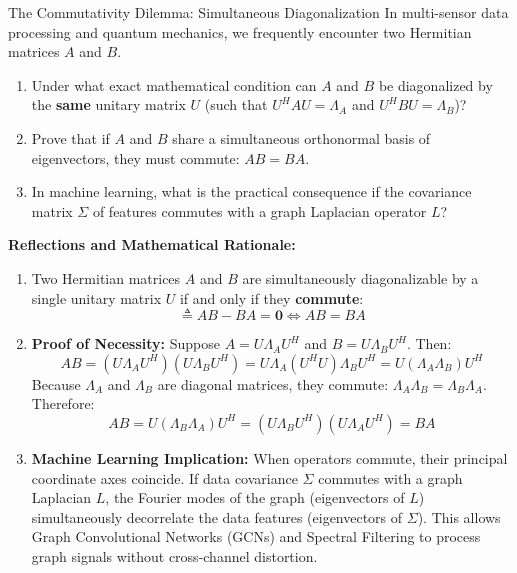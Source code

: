 \begin{ponderbox}{The Commutativity Dilemma: Simultaneous Diagonalization}
In multi-sensor data processing and quantum mechanics, we frequently encounter two Hermitian matrices $A$ and $B$.
\begin{enumerate}
    \item Under what exact mathematical condition can $A$ and $B$ be diagonalized by the \textbf{same} unitary matrix $U$ (such that $U^H A U = \Lambda_A$ and $U^H B U = \Lambda_B$)?
    \item Prove that if $A$ and $B$ share a simultaneous orthonormal basis of eigenvectors, they must commute: $AB = BA$.
    \item In machine learning, what is the practical consequence if the covariance matrix $\Sigma$ of features commutes with a graph Laplacian operator $L$?
\end{enumerate}
\tcblower
\textbf{Reflections and Mathematical Rationale:}
\begin{enumerate}
    \item Two Hermitian matrices $A$ and $B$ are simultaneously diagonalizable by a single unitary matrix $U$ if and only if they \textbf{commute}:
    \begin{equation*}
    [A, B] \triangleq AB - BA = \mathbf{0} \iff AB = BA
    \end{equation*}
    \item \textbf{Proof of Necessity:} Suppose $A = U \Lambda_A U^H$ and $B = U \Lambda_B U^H$. Then:
    \begin{equation*}
    AB = (U \Lambda_A U^H)(U \Lambda_B U^H) = U \Lambda_A (U^H U) \Lambda_B U^H = U (\Lambda_A \Lambda_B) U^H
    \end{equation*}
    Because $\Lambda_A$ and $\Lambda_B$ are diagonal matrices, they commute: $\Lambda_A \Lambda_B = \Lambda_B \Lambda_A$. Therefore:
    \begin{equation*}
    AB = U (\Lambda_B \Lambda_A) U^H = (U \Lambda_B U^H)(U \Lambda_A U^H) = BA
    \end{equation*}
    \item \textbf{Machine Learning Implication:} When operators commute, their principal coordinate axes coincide. If data covariance $\Sigma$ commutes with a graph Laplacian $L$, the Fourier modes of the graph (eigenvectors of $L$) simultaneously decorrelate the data features (eigenvectors of $\Sigma$). This allows Graph Convolutional Networks (GCNs) and Spectral Filtering to process graph signals without cross-channel distortion.
\end{enumerate}
\end{ponderbox}

